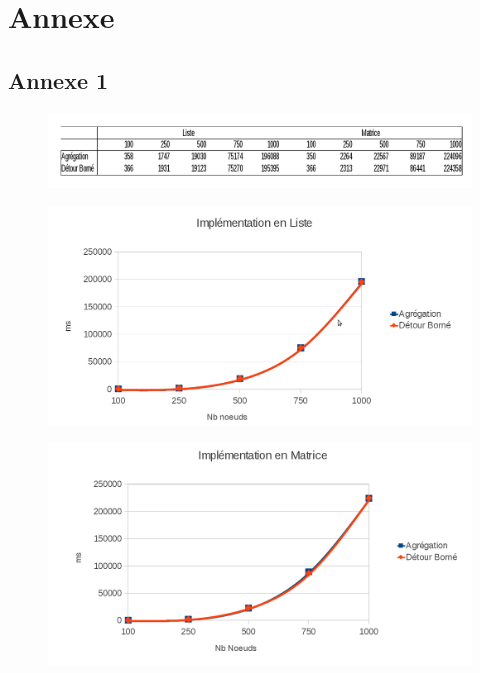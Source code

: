 \chapter{Annexe}
\section{Annexe 1}
\begin{figure}[!h] 
\begin{center}
  \includegraphics[scale=0.40]{a11.png}
  \end{center}
\end{figure} 
\begin{figure}[!h] 
\begin{center}
  \includegraphics[scale=0.40]{a12.png}
  \end{center}
\end{figure} 
\clearpage
\begin{figure}[!h] 
\begin{center}
  \includegraphics[scale=0.40]{a13.png}
\end{center}
\end{figure} 

